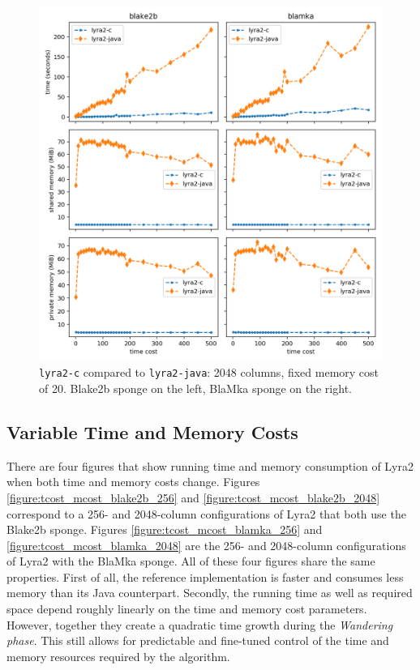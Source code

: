 \begin{figure}[H]
    \centering
    \includegraphics[width=\linewidth,keepaspectratio]{figures/tcost_2048}
    \caption{\texttt{lyra2-c} compared to \texttt{lyra2-java}: 2048 columns, fixed memory cost of 20. Blake2b sponge on the left, BlaMka sponge on the right.}
    \label{figure:tcost_2048}
\end{figure}

\subsection{Variable Time and Memory Costs}
\label{sec:no-fixed-costs}

There are four figures that show running time and memory consumption of Lyra2 when both time and memory costs change. Figures \ref{figure:tcost_mcost_blake2b_256} and \ref{figure:tcost_mcost_blake2b_2048} correspond to a 256- and 2048-column configurations of Lyra2 that both use the Blake2b sponge. Figures \ref{figure:tcost_mcost_blamka_256} and \ref{figure:tcost_mcost_blamka_2048} are the 256- and 2048-column configurations of Lyra2 with the BlaMka sponge. All of these four figures share the same properties. First of all, the reference implementation is faster and consumes less memory than its Java counterpart. Secondly, the running time as well as required space depend roughly linearly on the time and memory cost parameters. However, together they create a quadratic time growth during the \emph{Wandering phase}. This still allows for predictable and fine-tuned control of the time and memory resources required by the algorithm.

